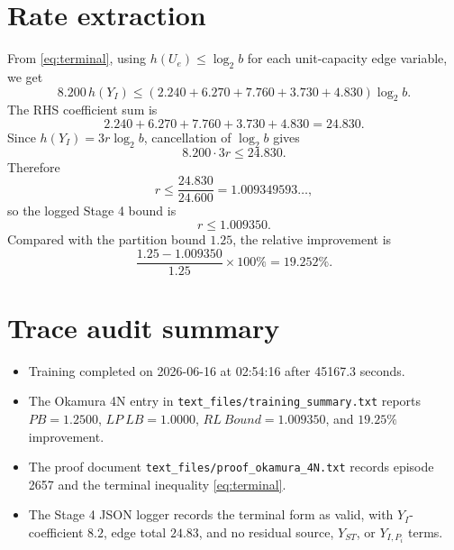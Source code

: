 \documentclass[11pt]{article}
\newcommand{\YI}{Y_I}
\begin{document}
\section{Rate extraction}

From \eqref{eq:terminal}, using \(h(U_e)\leq \log_2 b\) for each unit-capacity
edge variable, we get
\[
8.200\,h(\YI)
\leq
(2.240+6.270+7.760+3.730+4.830)\log_2 b.
\]
The RHS coefficient sum is
\[
2.240+6.270+7.760+3.730+4.830=24.830.
\]
Since \(h(\YI)=3r\log_2 b\), cancellation of \(\log_2 b\) gives
\[
8.200\cdot 3r \leq 24.830.
\]
Therefore
\[
r\leq \frac{24.830}{24.600}=1.009349593\ldots,
\]
so the logged Stage 4 bound is
\[
\boxed{r\leq 1.009350}.
\]
Compared with the partition bound \(1.25\), the relative improvement is
\[
\frac{1.25-1.009350}{1.25}\times 100\%
=19.252\%.
\]

\section{Trace audit summary}

\begin{itemize}
\item Training completed on 2026-06-16 at 02:54:16 after 45167.3 seconds.
\item The Okamura 4N entry in \texttt{text\_files/training\_summary.txt}
reports \(PB=1.2500\), \(LP\ LB=1.0000\), \(RL\ Bound=1.009350\), and
\(19.25\%\) improvement.
\item The proof document \texttt{text\_files/proof\_okamura\_4N.txt} records
episode 2657 and the terminal inequality \eqref{eq:terminal}.
\item The Stage 4 JSON logger records the terminal form as valid, with
\(Y_I\)-coefficient \(8.2\), edge total \(24.83\), and no residual source,
\(Y_{ST}\), or \(Y_{I,P_i}\) terms.
\end{itemize}
\end{document}
